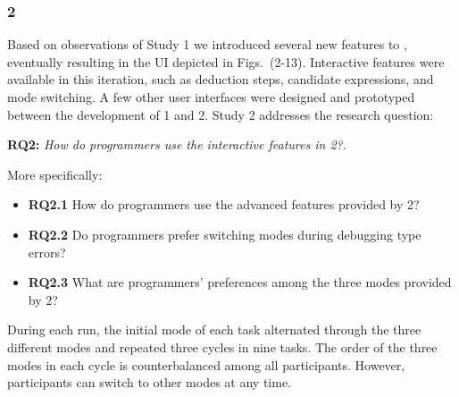 



\subsubsection{\textbf{\chameleon{} 2}}  \label{sub:us4}
Based on observations of Study 1 we introduced several new features to \chameleon{}, eventually resulting in the UI depicted in Figs.~(2-13). Interactive features were available in this iteration, such as deduction steps, candidate expressions, and mode switching. A few other user interfaces \cite{anonymous_interactive_2021} were designed and prototyped between the development of \chameleon{} 1 and \chameleon{} 2. Study 2 addresses the research question: 

\noindent\textbf{RQ2:} \textit{How do programmers use the interactive features in \chameleon{} 2?}. 

More specifically:
\begin{itemize}
    \item \textbf{RQ2.1} How do programmers use the advanced features provided by \chameleon{} 2?
    \item \textbf{RQ2.2} Do programmers prefer switching modes during debugging type errors?
    \item  \textbf{RQ2.3} What are programmers' preferences among the three modes provided by \chameleon{} 2?


\end{itemize}

During each run, the initial mode of each task alternated through the three different modes and repeated three cycles in nine tasks. The order of the three modes in each cycle is counterbalanced among all participants. However, participants can switch to other modes at any time. 




